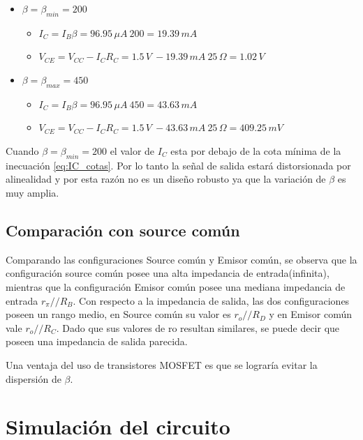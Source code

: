 \documentclass[10pt,spanish,a4paper,openany,notitlepage]{article}
\begin{document}
\begin{itemize}

\item $\beta = \beta_{min} = 200$

	\begin{itemize}
	\item $\displaystyle I_C = I_B \beta = 96.95\, \unit{\mu A}\ 200 = 19.39\, \unit{mA}$
	\item $\displaystyle V_{CE} = V_{CC} - I_C R_C = 1.5\, \unit{V}\ - 19.39\, \unit{mA}\ 25\, \unit{\Omega} = 1.02\, \unit{V}$
	\end{itemize}

\item $\beta = \beta_{max} = 450$

	\begin{itemize}
	\item $\displaystyle I_C = I_B \beta = 96.95\, \unit{\mu A}\ 450 = 43.63\, \unit{mA}$
	\item $\displaystyle V_{CE} = V_{CC} - I_C R_C = 1.5\, \unit{V}\ - 43.63\, \unit{mA}\ 25\, \unit{\Omega} = 409.25\, \unit{mV}$
	\end{itemize}

\end{itemize}

Cuando $\beta = \beta_{min} = 200$ el valor de $I_C$ esta por debajo
de la cota mínima de la inecuación \ref{eq:IC_cotas}.
Por lo tanto la señal de salida estará distorsionada por alinealidad y
por esta razón no es un diseño robusto ya que la variación de $\beta$
es muy amplia.


\subsection{Comparación con source común}

Comparando las configuraciones Source común y Emisor común, se observa 
que la configuración source común posee una alta impedancia de entrada(infinita), 
mientras que la configuración Emisor común posee una mediana impedancia de 
entrada $r_\pi//R_B$.  Con respecto  a la impedancia de salida, las dos 
configuraciones poseen un rango medio, en Source común su valor es $r_o//R_D$  y en Emisor común 
vale $r_o//R_C$.  Dado que sus valores de ro resultan similares, 
se puede decir que poseen una impedancia de salida parecida.

Una ventaja del uso de transistores MOSFET es que se lograría evitar
la dispersión de $\beta$. 

\section{Simulación del circuito}
\end{document}
